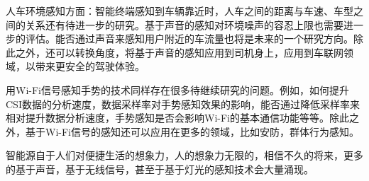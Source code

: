 人车环境感知方面：智能终端感知到车辆靠近时，人车之间的距离与车速、车型之间的关系还有待进一步的研究。基于声音的感知对环境噪声的容忍上限也需要进一步的评估。能否通过声音来感知用户附近的车流量也将是未来的一个研究方向。除此之外，还可以转换角度，将基于声音的感知应用到司机身上，应用到车联网领域，以带来更安全的驾驶体验。

用Wi-Fi信号感知手势的技术同样存在很多待继续研究的问题。例如，如何提升CSI数据的分析速度，数据采样率对手势感知效果的影响，能否通过降低采样率来相对提升数据分析速度，手势感知是否会影响Wi-Fi的基本通信功能等等。除此之外，基于Wi-Fi信号的感知还可以应用在更多的领域，比如安防，群体行为感知。

智能源自于人们对便捷生活的想象力，人的想象力无限的，相信不久的将来，更多的基于声音，基于无线信号，甚至于基于灯光的感知技术会大量涌现。